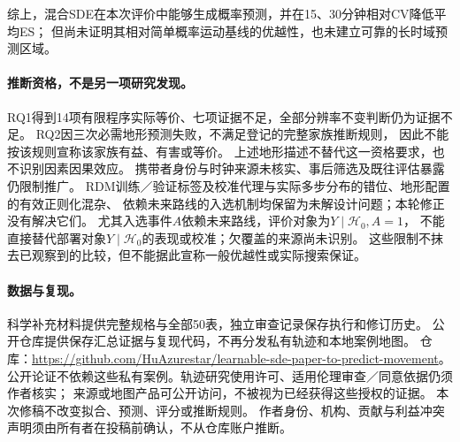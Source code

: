综上，混合SDE在本次评价中能够生成概率预测，并在15、30分钟相对CV降低平均ES；
但尚未证明其相对简单概率运动基线的优越性，也未建立可靠的长时域预测区域。

\paragraph{推断资格，不是另一项研究发现。}
RQ1得到14项有限程序实际等价、七项证据不足，全部分辨率不变判断仍为证据不足。
RQ2因三次必需地形预测失败，不满足登记的完整家族推断规则，
因此不能按该规则宣称该家族有益、有害或等价。
上述地形描述不替代这一资格要求，也不识别因素因果效应。
携带者身份与时钟来源未核实、事后筛选及既往评估暴露仍限制推广。
RDM训练／验证标签及校准代理与实际多步分布的错位、地形配置的有效正则化混杂、
依赖未来路线的入选机制均保留为未解设计问题；本轮修正没有解决它们。
尤其入选事件$A$依赖未来路线，评价对象为$Y\mid\mathcal H_0,A=1$，
不能直接替代部署对象$Y\mid\mathcal H_0$的表现或校准；欠覆盖的来源尚未识别。
这些限制不抹去已观察到的比较，但不能据此宣称一般优越性或实际搜索保证。

\paragraph{数据与复现。}\label{sec:case-horizons}\hypertarget{sec:case-horizons}{}
科学补充材料提供完整规格与全部50表，独立审查记录保存执行和修订历史。
公开仓库提供保存汇总证据与复现代码，不再分发私有轨迹和本地案例地图。
仓库：\url{https://github.com/HuAzurestar/learnable-sde-paper-to-predict-movement}。
公开论证不依赖这些私有案例。轨迹研究使用许可、适用伦理审查／同意依据仍须作者核实；
来源或地图产品可公开访问，不被视为已经获得这些授权的证据。
本次修稿不改变拟合、预测、评分或推断规则。
作者身份、机构、贡献与利益冲突声明须由所有者在投稿前确认，不从仓库账户推断。


